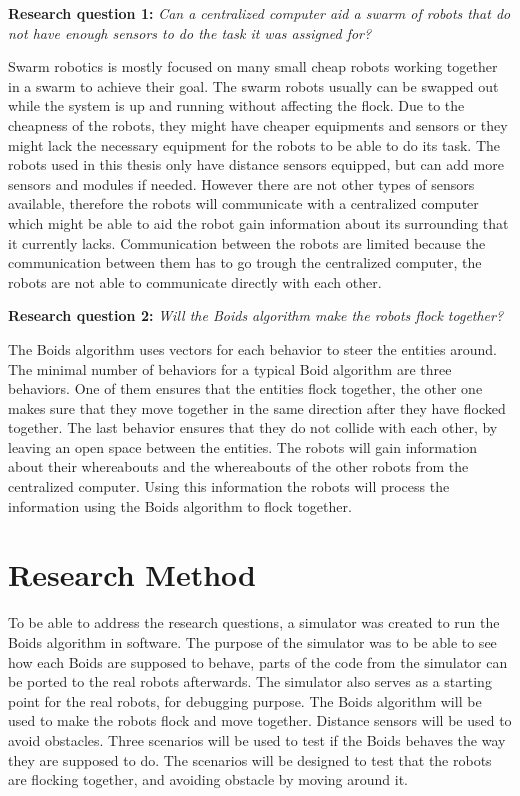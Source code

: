 \textbf{Research question 1:} {\it Can a centralized computer aid a swarm of robots that do not have enough sensors to do the task it was assigned for?}

Swarm robotics is mostly focused on many small cheap robots working together in a swarm to achieve their goal. The swarm robots usually can be swapped out while the system is up and running without affecting the flock.
Due to the cheapness of the robots, they might have cheaper equipments and sensors or they might lack the necessary equipment for the robots to be able to do its task. 
The robots used in this thesis only have distance sensors equipped, but can add more sensors and modules if needed. However there are not other types of sensors available, therefore the robots will communicate with a centralized computer which might be able to aid the robot gain information about its surrounding that it currently lacks.
Communication between the robots are limited because the communication between them has to go trough the centralized computer, the robots are not able to communicate directly with each other.


\textbf{Research question 2:} {\it Will the Boids algorithm make the robots flock together?}

The Boids algorithm uses vectors for each behavior to steer the entities around. The minimal number of behaviors for a typical Boid algorithm are three behaviors. One of them ensures that the entities flock together, the other one makes sure that they move together in the same direction after they have flocked together. The last behavior ensures that they do not collide with each other, by leaving an open space between the entities. The robots will gain information about their whereabouts and the whereabouts of the other robots from the centralized computer. Using this information the robots will process the information using the Boids algorithm to flock together.


\section{Research Method}
\label{sec:researchMethod}
To be able to address the research questions, a simulator was created to run the Boids algorithm in software. The purpose of the simulator was to be able to see how each Boids are supposed to behave, parts of the code from the simulator can be ported to the real robots afterwards. The simulator also serves as a starting point for the real robots, for debugging purpose.
The Boids algorithm will be used to make the robots flock and move together. Distance sensors will be used to avoid obstacles.
Three scenarios will be used to test if the Boids behaves the way they are supposed to do. The scenarios will be designed to test that the robots are flocking together, and avoiding obstacle by moving around it.

